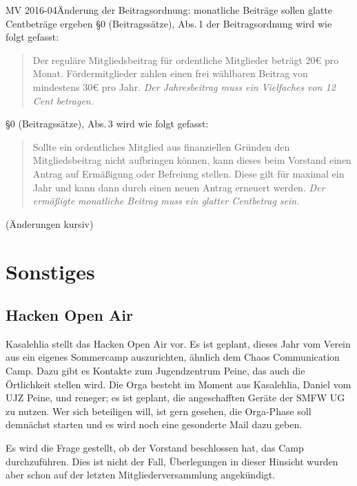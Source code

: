 \documentclass{s0minutes}
\begin{document}
\begin{resolution}{MV 2016-04}{}{Änderung der
  Beitragsordnung: monatliche Beiträge sollen glatte Cent\-beträge ergeben}{}
  §0 (Beitragssätze), Abs.\,1 der Beitragsordnung wird wie folgt gefasst:
  \begin{quote}
    Der reguläre Mitgliedsbeitrag für ordentliche Mitglieder beträgt 20€ pro
    Monat. Fördermitglieder zahlen einen frei wählbaren Beitrag von mindestens
    30€ pro Jahr. \emph{Der Jahresbeitrag muss ein Vielfaches von 12 Cent
    betragen.}
  \end{quote}

  §0 (Beitragssätze), Abs.\,3 wird wie folgt gefasst:
  \begin{quote}
    Sollte ein ordentliches Mitglied aus finanziellen Gründen den
    Mitgliedsbeitrag nicht aufbringen können, kann dieses beim Vorstand einen
    Antrag auf Ermäßigung oder Befreiung stellen. Diese gilt für maximal ein
    Jahr und kann dann durch einen neuen Antrag erneuert werden. \emph{Der
    ermäßigte monatliche Beitrag muss ein glatter Centbetrag sein.}
  \end{quote}

  (Änderungen kursiv)
\end{resolution}

\section{Sonstiges}

\subsection{Hacken Open Air}\label{sec:hackenopenair}
Kasalehlia stellt das Hacken Open Air vor. Es ist geplant, dieses Jahr vom
Verein aus ein eigenes Sommercamp auszurichten, ähnlich dem Chaos Communication
Camp. Dazu gibt es Kontakte zum Jugendzentrum Peine, das auch die Örtlichkeit
stellen wird. Die Orga besteht im Moment aus Kasalehlia, Daniel vom
UJZ Peine, und reneger; es ist geplant, die angeschafften Geräte der
SMFW UG zu nutzen. Wer sich beteiligen will, ist gern gesehen, die Orga-Phase
soll demnächst starten und es wird noch eine gesonderte Mail dazu geben.

Es wird die Frage gestellt, ob der Vorstand beschlossen hat, das Camp
durchzuführen. Dies ist nicht der Fall, Überlegungen in dieser Hinsicht wurden
aber schon auf der letzten Mitgliederversammlung angekündigt.
\end{document}
